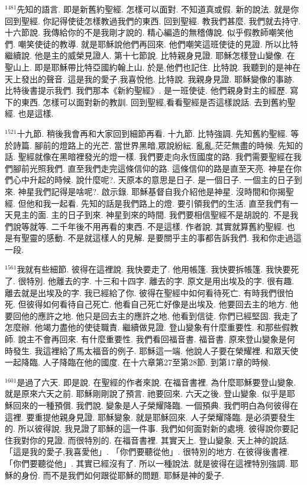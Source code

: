 \documentclass{book}
\begin{document}
$^{1481}$先知的語言.
即是新舊約聖經.
怎樣可以面對.
不知道真或假.
新的說法.
就是你回到聖經.
你記得使徒怎樣教過我們的東西.
回到聖經.
教我們甚麼.
我們就去持守.
十六節說.
我傳給你的不是我剛才說的.
精心編造的無稽傳說.
似乎假教師嘲笑他們.
嘲笑使徒的教導.
就是耶穌說他們再回來.
他們嘲笑這班使徒的見證.
所以比特繼續說.
他是主的威榮見證人.
第十七節說.
比特親身見證.
耶穌怎樣登山變像.
在聖山上.
即是耶穌帶比特亞國約翰上山.
於是,他們也記住.
比特說.
我聽到的是神在天上發出的聲音.
這是我的愛子,我喜悅他.
比特說.
我親身見證.
耶穌變像的事跡.
比特後書提示我們.
我們那本《新約聖經》.
是一班使徒.
他們親身對主的經歷.
寫下的東西.
怎樣可以面對新的教訓.
回到聖經,看看聖經是否這樣說話.
去到舊約聖經.
也是這樣.

$^{1521}$十九節.
稍後我會再和大家回到細節再看.
十九節.
比特強調.
先知舊約聖經.
等於詩篇.
腳前的燈路上的光芒.
當世界黑暗,眾說紛紜.
亂亂,茫茫無盡的時候.
先知的話.
聖經就像在黑暗裡發光的燈一樣.
我們要走向永恆國度的路.
我們需要聖經在我們腳前光照我們.
直至我們走完這條信仰的路.
這條信仰的路是直至天亮.
神星在你們心中升起的時候.
說什麼呢?.
天原本的意思是日子.
是一個日子.
一個主的日子到來.
神星我們記得是啥呢?.
啟示錄.
耶穌基督自我介紹他是神星.
沒時間和你揭聖經.
但他和我一起看.
先知的話是我們路上的燈.
要引領我們的生活.
直至我們有一天見主的面.
主的日子到來.
神星到來的時間.
我們要相信聖經不是胡說的.
不是我們說等就等.
二千年後不用再看的東西.
不是這樣.
作者說.
其實就算舊約聖經.
也是有聖靈的感動.
不是就這樣人的見解.
是要關乎主的事都告訴我們.
我和你走過這一段.

$^{1561}$我就有些細節.
彼得在這裡說.
我快要走了.
他用帳篷.
我快要拆帳篷.
我快要死了.
很特別.
他離去的字.
十三和十四字.
離去的字.
原文是用出埃及的字.
很有趣.
離去就是出埃及的字.
我已經給了你.
彼得在聖經中如何看待死亡.
有時我們很怕死.
但彼得如何看待自己死亡.
他看自己死亡好像是出埃及.
他要回去主的地方.
他要回他的應許之地.
他只是回去主的應許之地.
他看到信徒.
你們已經堅固.
我走了怎麼辦.
他竭力盡他的使徒職責.
繼續做見證.
登山變象有什麼重要性.
和那些假教師.
說主不會再回來.
有什麼重要性.
我們看回福音書.
福音書.
原來登山變象是何時發生.
我這裡給了馬太福音的例子.
耶穌這一端.
他說人子要在榮耀裡.
和眾天使一起降臨.
人子降臨在他的國度.
在十六章第27至第28節.
到第17章的時候.

$^{1601}$是過了六天.
即是說.
在聖經的作者來說.
在福音書裡.
為什麼耶穌要登山變象.
就是原來六天之前.
耶穌剛剛說了預言.
祂要回來.
六天之後.
登山變象.
似乎是耶穌回來的一種預償.
我們說.
變象是人子榮耀降臨.
一個預典.
我們明白為何彼得在這裡.
要重提他親身見證.
耶穌變象.
就是耶穌回來.
人子榮耀降臨.
是必須要發生的.
所以彼得說.
我見證了耶穌的這一件事.
我們如何面對新的處境.
彼得說你要記住我對你的見證.
而很特別的.
在福音書裡.
其實天上.
登山變象.
天上神的說話.
「這是我的愛子,我喜愛他」.
「你們要聽從他」.
很特別的地方.
在彼得後書裡.
「你們要聽從他」.
其實已經沒有了.
所以一種說法.
就是彼得在這裡特別強調.
耶穌的身份.
而不是我們如何跟從耶穌的問題.
耶穌是神的愛子.
\end{document}

